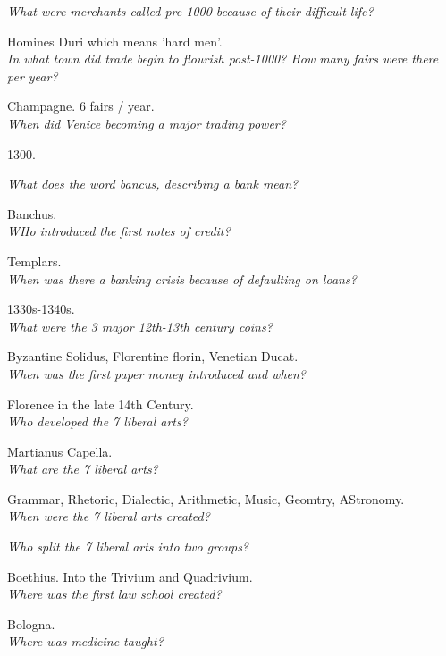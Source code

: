 \documentclass[12pt]{article}
\begin{document}
\textit{What were merchants called pre-1000 because of their difficult life?}

Homines Duri which means 'hard men'.\\

\textit{In what town did trade begin to flourish post-1000? How many fairs were there per year?}

Champagne. 6 fairs / year.\\

\textit{When did Venice becoming a major trading power?}

1300.

\textit{What does the word bancus, describing a bank mean?}

Banchus.\\

\textit{WHo introduced the first notes of credit?}

Templars.\\

\textit{When was there a banking crisis because of defaulting on loans?}

1330s-1340s.\\

\textit{What were the 3 major 12th-13th century coins?}

Byzantine Solidus, Florentine florin, Venetian Ducat.\\

\textit{When was the first paper money introduced and when?}

Florence in the late 14th Century.\\

\textit{Who developed the 7 liberal arts?}

Martianus Capella.\\

\textit{What are the 7 liberal arts?}

Grammar, Rhetoric, Dialectic, Arithmetic, Music, Geomtry, AStronomy.\\

\textit{When were the 7 liberal arts created?}

\textit{Who split the 7 liberal arts into two groups?}

Boethius. Into the Trivium and Quadrivium.\\

\textit{Where was the first law school created?}

Bologna.\\

\textit{Where was medicine taught?}
\end{document}
